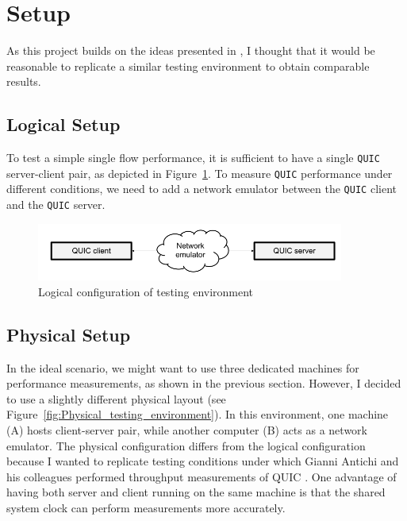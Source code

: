 \documentclass[12pt,a4paper,twoside,openright]{report}
\begin{document}




\section{Setup}

As this project builds on the ideas presented in \cite{Making_QUIC_Quicker}, I thought that it would be reasonable to replicate a similar testing environment to obtain comparable results.

\subsection{Logical Setup}
To test a simple single flow performance, it is sufficient to have a single \texttt{QUIC} server-client pair, as depicted in Figure~\ref{fig:Logical_testing_environment}.
To measure \texttt{QUIC} performance under different conditions, we need to add a network emulator between the \texttt{QUIC} client and the \texttt{QUIC} server.

    \begin{figure}[ht]
    \centering
    \includegraphics[width=0.9\textwidth]{figs/Logical_testing_environment.png}
    \caption{Logical configuration of testing environment}
    \label{fig:Logical_testing_environment}
    \end{figure}

\subsection{Physical Setup} \label{physical_setup_subsection}
    In the ideal scenario, we might want to use three dedicated machines for performance measurements, as shown in the previous section.
    However, I decided to use a slightly different physical layout (see Figure~\ref{fig:Physical_testing_environment}).
    In this environment, one machine (A) hosts client-server pair, while another computer (B) acts as a network emulator.
    The physical configuration differs from the logical configuration because I wanted to replicate testing conditions under which Gianni Antichi and his colleagues performed throughput measurements of QUIC \cite{Making_QUIC_Quicker}.
    One advantage of having both server and client running on the same machine is that the shared system clock can perform measurements more accurately. 
    
\end{document}
